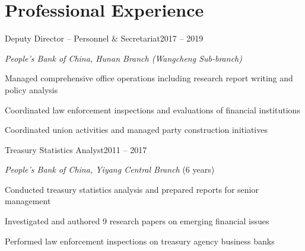 \section{Professional Experience}

\begin{joblong}{Deputy Director -- Personnel \& Secretariat}{2017 -- 2019}
\item \textit{People's Bank of China, Hunan Branch (Wangcheng Sub-branch)}
\item Managed comprehensive office operations including research report writing and policy analysis
\item Coordinated law enforcement inspections and evaluations of financial institutions
\item Coordinated union activities and managed party construction initiatives
\end{joblong}

\vspace{4pt}

\begin{joblong}{Treasury Statistics Analyst}{2011 -- 2017}
\item \textit{People's Bank of China, Yiyang Central Branch} (6 years)
\item Conducted treasury statistics analysis and prepared reports for senior management
\item Investigated and authored 9 research papers on emerging financial issues
\item Performed law enforcement inspections on treasury agency business banks
\end{joblong}
